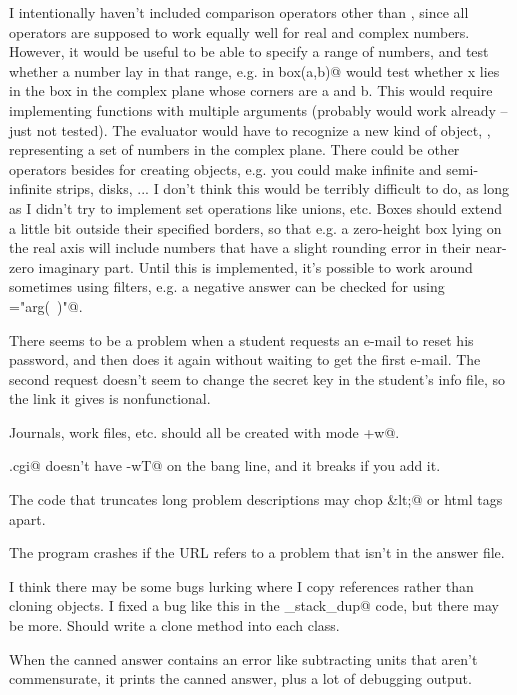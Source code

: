 \documentclass{doc}
\begin{document}
I intentionally haven't included comparison operators other than \verb@eq@, since all operators are
supposed to work equally well for real and complex numbers. However, it would be useful to be able
to specify a range of numbers, and test whether a number lay in that range, e.g.
\verb@x in box(a,b)@ would test whether x lies in the box in the complex plane whose corners are a and b.
This would require implementing functions with multiple arguments (probably would work already --
just not tested). The evaluator would have to recognize a new kind of object, \verb@Set@,
representing a set of numbers in the complex plane.
There could be other operators besides \verb@box@ for creating \verb@Set@ objects, e.g. 
you could make infinite and semi-infinite strips, disks, ... I don't think this would be
terribly difficult to do, as long as I didn't try to implement set operations like unions, etc.
Boxes should extend a little bit outside
their specified borders, so that e.g. a zero-height box lying on the real axis will include numbers
that have a slight rounding error in their near-zero imaginary part. 
Until this is implemented, it's possible to work around sometimes using
filters, e.g. a negative answer can be checked for using \verb@filter="arg(~)"@.

There seems to be a problem when a student requests an e-mail to reset his password,
and then does it again without waiting to get the first e-mail. The second request
doesn't seem to change the secret key in the student's info file, so the link it
gives is nonfunctional.

Journals, work files, etc. should all be created with mode \verb@g+w@.

\verb@Spotter.cgi@ doesn't have \verb@-wT@ on the bang line, and it breaks
if you add it.

The code that truncates long problem descriptions may chop \verb@&lt;@ or html tags apart.

The program crashes if the URL refers to a problem that isn't in the answer file.

I think there may be some bugs lurking where I copy references rather than
cloning objects. I fixed a bug like this in the \verb@options_stack_dup@ code, but
there may be more. Should write a clone method into each class.


When the canned answer contains an error like subtracting units that aren't
commensurate, it prints the canned answer, plus a lot of debugging output.
\end{document}
